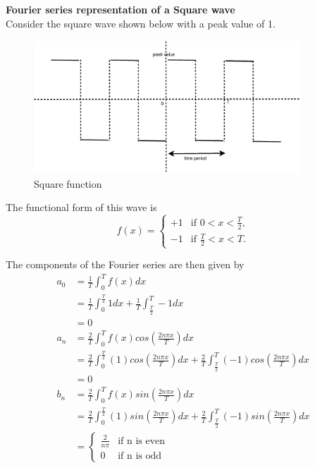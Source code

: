 \documentclass[a4paper,12pt]{article}
\begin{document}
\noindent\textbf{Fourier series representation of a Square wave} \\
Consider the square wave shown below with a peak value of 1. \\
\begin{figure}[htpb]
  \begin{center}
    \includegraphics*[width=10cm,height=5cm]{./images/square.eps}
    \caption {Square function}
    \label{fig:square}
  \end{center}
\end{figure}

The functional form of this wave is
\begin{equation*}
f(x) = 
\begin{cases} 
+1 & \text{if $0<x<\frac{T}{2}$,} \\
-1 & \text{if $\frac{T}{2} < x < T$.}
\end{cases}
\end{equation*}

The components of the Fourier series are then given by 
{
\allowdisplaybreaks
\begin{align*}
 a_0 &= \frac{1}{T} \int_{0}^{T} f(x) dx \\
     &= \frac{1}{T} \int_{0}^{\frac{T}{2}} 1 dx + \frac{1}{T} \int_{\frac{T}{2}}^{T} -1 dx \\
     &= 0 \\
 a_n &= \frac{2}{T} \int_{0}^{T} f(x) cos \left( \frac{2n\pi x}{T} \right) dx \\
    &= \frac{2}{T} \int_{0}^{\frac{T}{2}} (1) cos \left( \frac{2n\pi x}{T} \right) dx + \frac{2}{T} \int_{\frac{T}{2}}^{T} (-1) cos \left( \frac{2n\pi x}{T} \right) dx \\
     &= 0 \\
 b_n &= \frac{2}{T} \int_{0}^{T} f(x) sin \left( \frac{2n\pi x}{T} \right) dx \\
    &= \frac{2}{T} \int_{0}^{\frac{T}{2}} (1) sin \left( \frac{2n\pi x}{T} \right) dx + \frac{2}{T} \int_{\frac{T}{2}}^{T} (-1) sin \left( \frac{2n\pi x}{T} \right) dx \\
     &= \begin{cases} 
        \frac{2}{n\pi} & \text{if n is even} \\
        0		& \text{if n is odd}
        \end{cases}
\end{align*}
}
\end{document}
